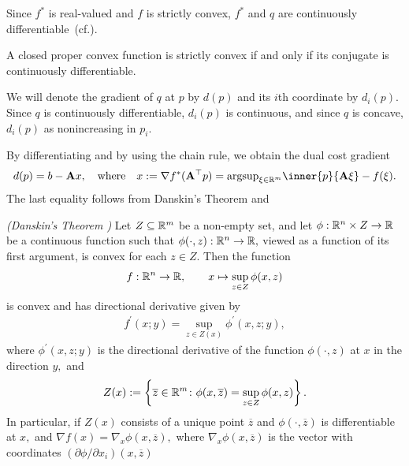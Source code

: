Since $f^*$ is real-valued and $f$ is strictly convex, 
$f^*$ and $q$ are continuously differentiable~(cf.\cite[Theorem~26.3]{Rockafellar1970}).
\begin{theorem*}
  \emph{}
  A closed proper convex function is strictly convex
  if and only if its conjugate is continuously differentiable.
\end{theorem*}

We will denote the gradient of $q$ at $p$ by $d(p)$
and its $i$th coordinate by $d_i(p).$
Since $q$ is continuously differentiable, $d_i(p)$ is continuous, 
and since $q$ is concave, 
$d_i(p)$ as nonincreasing in $p_i.$

By differentiating and by using the chain rule, 
we obtain the dual cost gradient
\begin{gather}
  d(p)=b-\mathbf{A}x,
  \quad
  \text{where}
  \quad
  x:=
  \nabla
  f^*
  (
    \mathbf{A}^\top
    p
  )
  =
  \mathrm{argsup}
  _{\xi \in \R^m}
  \inner{p}{\mathbf{A}\xi}
  - f(\xi)
  .
\end{gather}
The last equality follows from Danskin's Theorem and \cite[Theorem~23.5]{Rockafellar1970}


\begin{proposition}
  \emph{(Danskin's Theorem \cite[page 649]{Bertsekas2003})}
  Let 
  $
    Z \subseteq \mathbb{R}^m
  $
  be a non-empty set, 
  and let 
  $
    \phi :
    \mathbb{R}^n \times Z \to \mathbb{R}
  $
  be a continuous function such that
  $
    \phi(\cdot,z)
    :
    \mathbb{R}^n \to \mathbb{R},
  $
  viewed as a function of its first argument, 
  is convex for each 
  $
    z \in Z.
  $
  Then the function 
  \begin{gather}
    f:\mathbb{R}^n \to \mathbb{R}
    ,
    \qquad
    x\mapsto
    \sup_{z\in Z}
    \phi(x,z)
  \end{gather}
  is convex and has directional derivative given by
  \begin{gather}
    f^{'}(x;y)
    =
    \sup_{z \in Z(x)}
    \phi^{'}(x,z; y)
    ,
  \end{gather}
  where 
  $
    \phi^{'}(x,z; y)
  $
  is the directional derivative of the function 
  $
    \phi(\cdot,z)
  $
  at
  $x$ in the direction $y,$
  and
  \begin{gather}
    Z(x)
    :=
    \left\{ 
      \overline{z} \in \mathbb{R}^m
      \colon
      \phi(x, \overline{z})
      =
    \sup_{z\in Z}
    \phi(x,z)
  \right\}
  .
  \end{gather}
  In particular, if $Z(x)$ consists of a unique point 
  $\overline{z}$
  and
  $
    \phi(\cdot, \overline{z})
  $
  is differentiable at $x,$
  and 
  $
    \nabla f(x)
    =
    \nabla_x
    \phi(x,\overline{z})
    ,
  $
  where 
  $
    \nabla_x
    \phi(x,\overline{z})
  $
  is the vector with coordinates
  $
    (\partial \phi / \partial x_i)
    (x,\overline{z})
  $
\end{proposition}


